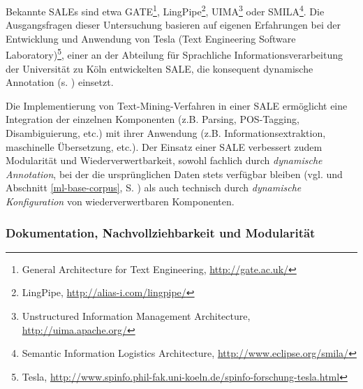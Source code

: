 \documentclass[abstracton, 12pt]{scrartcl}
\begin{document}
Bekannte SALEs sind etwa GATE\footnote{General Architecture for Text Engineering, \url{http://gate.ac.uk/}}, LingPipe\footnote{LingPipe, \url{http://alias-i.com/lingpipe/}}, UIMA\footnote{Unstructured Information Management Architecture, \url{http://uima.apache.org/}} oder SMILA\footnote{Semantic Information Logistics Architecture, \url{http://www.eclipse.org/smila/}}. Die Ausgangsfragen dieser Untersuchung basieren auf eigenen Erfahrungen \citep{Steeg2007} bei der Entwicklung und Anwendung von Tesla (Text Engineering Software Laboratory)\footnote{Tesla, \url{http://www.spinfo.phil-fak.uni-koeln.de/spinfo-forschung-tesla.html}}, einer an der Abteilung für Sprachliche Informationsverarbeitung der Universität zu Köln entwickelten SALE, die konsequent dynamische Annotation (s. \citealt{BendenAndHermes2004, HermesAndBenden2005}) einsetzt.

Die Implementierung von Text-Mining-Verfahren in einer SALE ermöglicht eine Integration der einzelnen Komponenten (z.B. Parsing, POS-Tagging, Disambiguierung, etc.) mit ihrer Anwendung (z.B. Informationsextraktion, maschinelle Übersetzung, etc.). Der Einsatz einer SALE verbessert zudem Modularität und Wiederverwertbarkeit, sowohl fachlich durch \emph{dynamische Annotation}, bei der die ursprünglichen Daten stets verfügbar bleiben (vgl. \citealt{HermesAndBenden2005} und Abschnitt \ref{ml-base-corpus}, S. \pageref{ml-base-corpus}) als auch technisch durch \emph{dynamische Konfiguration} \citep[135]{HuntAndThomas2003} von wiederverwertbaren Komponenten.

\subsubsection{Dokumentation, Nachvollziehbarkeit und Modularität} \label{theorie-doku-bedeutung}
\end{document}
